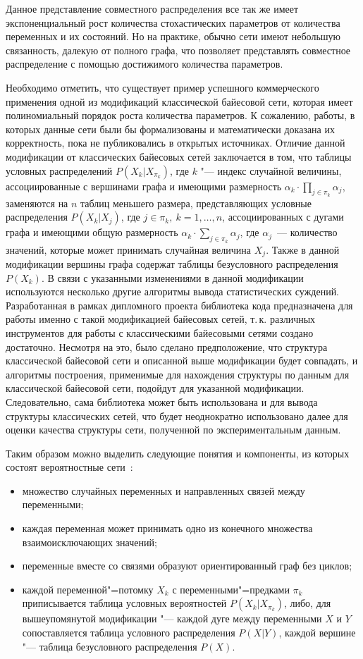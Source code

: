 Данное представление совместного распределения все так же имеет экспоненциальный рост количества стохастических параметров от количества переменных и их состояний.
Но на практике, обычно сети имеют небольшую связанность, далекую от полного графа, что позволяет представлять совместное распределение с помощью достижимого количества параметров.


\label{page:domain:bayes_mod}
Необходимо отметить, что существует пример успешного коммерческого применения одной из модификаций классической байесовой сети, которая имеет полиномиальный порядок роста количества параметров.
К сожалению, работы, в которых данные сети были бы формализованы и математически доказана их корректность, пока не публиковались в открытых источниках.
Отличие данной модификации от классических байесовых сетей заключается в том, что таблицы условных распределений $ P(X_k | X_{\pi_k}) $, где $k$ "--- индекс случайной величины, ассоциированные с вершинами графа и имеющими размерность $ \alpha_k \cdot \prod_{j \in \pi_k}\alpha_j $, заменяются на $ n $ таблиц меньшего размера, представляющих условные распределения $ P(X_k | X_j) $, где $ j \in \pi_k,\ k = 1,\dotsc,n $, ассоциированных с дугами графа и имеющими общую размерность $ \alpha_k \cdot \sum_{j \in \pi_k}\alpha_j $, где $\alpha_j$~--- количество значений, которые может принимать случайная величина $X_j$.
Также в данной модификации вершины графа содержат таблицы безусловного распределения $ P(X_k) $.
В связи с указанными изменениями в данной модификации используются несколько другие алгоритмы вывода статистических суждений.
Разработанная в рамках дипломного проекта библиотека кода предназначена для работы именно с такой модификацией байесовых сетей, т.\,к. различных инструментов для работы с классическими байесовыми сетями создано достаточно.
Несмотря на это, было сделано предположение, что структура классической байесовой сети и описанной выше модификации будет совпадать, и алгоритмы построения, применимые для нахождения структуры по данным для классической байесовой сети, подойдут для указанной модификации.
Следовательно, сама библиотека может быть использована и для вывода структуры классических сетей, что будет неоднократно использовано далее для оценки качества структуры сети, полученной по экспериментальным данным.

Таким образом можно выделить следующие понятия и компоненты, из которых состоят вероятностные сети~\cite{terehov_2003}:
\begin{itemize}
  \item множество случайных переменных и направленных связей между переменными;
  \item каждая переменная может принимать одно из конечного множества взаимоисключающих значений;
  \item переменные вместе со связями образуют ориентированный граф без циклов;
  \item каждой переменной"=потомку $X_k$ с переменными"=предками $\pi_k$
приписывается таблица условных вероятностей $P(X_k | X_{\pi_k})$, либо, для вышеупомянутой модификации "--- каждой дуге между переменными $ X $ и $ Y $ сопоставляется таблица условного распределения $ P (X | Y)$, каждой вершине "--- таблица безусловного распределения $ P(X) $.
\end{itemize}

